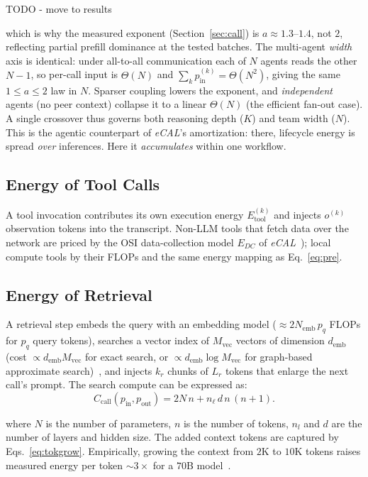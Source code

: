 \documentclass[journal]{IEEEtran}
\newcommand{\ecal}{\textit{eCAL}}
\begin{document}
TODO - move to results

which is why the measured exponent (Section~\ref{sec:call}) is $a\!\approx\!1.3$--$1.4$, not $2$,
reflecting partial prefill dominance at the tested batches. The multi-agent \emph{width} axis is
identical: under all-to-all communication each of $N$ agents reads the other $N\!-\!1$, so per-call
input is $\Theta(N)$ and $\sum_k p_{\mathrm{in}}^{(k)}=\Theta(N^2)$, giving the same
$1\!\le\!a\!\le\!2$ law in $N$. Sparser coupling lowers the exponent, and \emph{independent} agents
(no peer context) collapse it to a linear $\Theta(N)$ (the efficient fan-out case). A single crossover
thus governs both reasoning depth ($K$) and team width ($N$). This is the agentic counterpart of
\ecal{}'s amortization: there, lifecycle energy is spread \emph{over} inferences. Here it
\emph{accumulates} within one workflow.

\subsection{Energy of Tool Calls} 
A tool invocation contributes its own execution energy $E_{\mathrm{tool}}^{(k)}$
and injects $o^{(k)}$ observation tokens into the transcript. Non-LLM tools that fetch data over the
network are priced by the OSI data-collection model $E_{DC}$ of \ecal{}~\cite{chou2026ecal}); local compute tools by their FLOPs and the same energy mapping as
Eq.~\eqref{eq:pre}.

\subsection{Energy of Retrieval} 
A retrieval step embeds the query with an embedding model
($\approx 2N_{\mathrm{emb}}\,p_q$ FLOPs for $p_q$ query tokens), searches a vector index of
$M_{\mathrm{vec}}$ vectors of dimension $d_{\mathrm{emb}}$ (cost $\propto d_{\mathrm{emb}}M_{\mathrm{vec}}$
for exact search, or $\propto d_{\mathrm{emb}}\log M_{\mathrm{vec}}$ for graph-based approximate
search)~\cite{HNSW_Malkov2020}, and injects $k_r$ chunks of $L_r$ tokens that enlarge the next
call's prompt. The search compute can be expressed as: 
\begin{equation}
C_{\mathrm{call}}(p_{\mathrm{in}},p_{\mathrm{out}}) = 2N\,n + n_\ell\, d\, n\,(n+1).
\label{eq:ccall}
\end{equation}

\noindent where $N$ is the number of parameters, $n$ is the number of tokens, $n_l$ and $d$ are the number of layers and hidden size. The added context tokens are
captured by
Eqs.~\eqref{eq:tokgrow}. Empirically, growing the context from $2$K to $10$K tokens raises measured energy per token
$\sim\!3\times$ for a $70$B model~\cite{tokenpowerbench2026,sweetspot2026}. 
\end{document}
